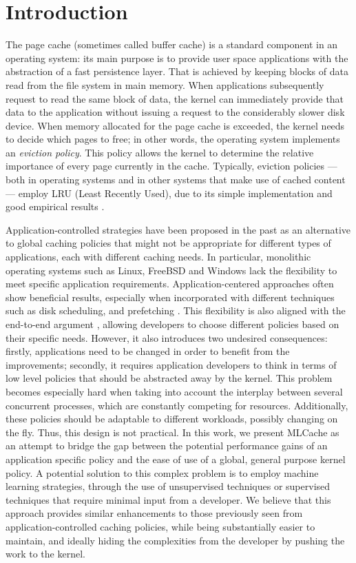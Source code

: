 \section{Introduction}

The page cache (sometimes called buffer cache) is a standard component in an
operating system: its main purpose is to provide user space applications with
the abstraction of a fast persistence layer. That is achieved by keeping blocks
of data read from the file system in main memory. When applications
subsequently request to read the same block of data, the kernel can immediately
provide that data to the application without issuing a request to the
considerably slower disk device. When memory allocated for the page cache is
exceeded, the kernel needs to decide which pages to free; in other words, the
operating system implements an \emph{eviction policy}.  This policy allows the
kernel to determine the relative importance of every page currently in the
cache. Typically, eviction policies --- both in operating systems and in other
systems that make use of cached content --- employ LRU (Least Recently Used),
due to its simple implementation and good empirical results
\cite{Denning:1968}.

Application-controlled strategies have been proposed in the past as an
alternative to global caching policies that might not be appropriate for
different types of applications, each with different caching needs. In
particular, monolithic operating systems such as Linux, FreeBSD and Windows
lack the flexibility to meet specific application requirements.
Application-centered approaches often show beneficial results, especially when
incorporated with different techniques such as disk scheduling, and prefetching
\cite{Cao:1996}. This flexibility is also aligned with the end-to-end argument
\cite{Saltzer:1984}, allowing developers to choose different policies based on
their specific needs. However, it also introduces two undesired consequences:
firstly, applications need to be changed in order to benefit from the
improvements; secondly, it requires application developers to think in terms of
low level policies that should be abstracted away by the kernel.  This problem
becomes especially hard when taking into account the interplay between several
concurrent processes, which are constantly competing for resources.
Additionally, these policies should be adaptable to different workloads,
possibly changing on the fly. Thus, this design is not practical. In this work,
we present MLCache as an attempt to bridge the gap between the potential
performance gains of an application specific policy and the ease of use of a
global, general purpose kernel policy. A potential solution to this complex
problem is to employ machine learning strategies, through the use of
unsupervised techniques or supervised techniques that require minimal input
from a developer. We believe that this approach provides similar enhancements
to those previously seen from application-controlled caching policies, while
being substantially easier to maintain, and ideally hiding the complexities
from the developer by pushing the work to the kernel.
